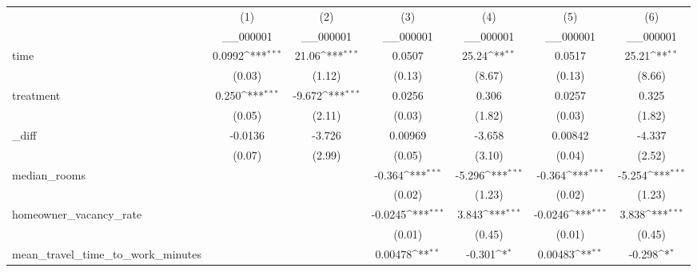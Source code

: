 {
\def\sym#1{\ifmmode^{#1}\else\(^{#1}\)\fi}
\begin{tabular}{l*{6}{c}}
\hline\hline
            &\multicolumn{1}{c}{(1)}&\multicolumn{1}{c}{(2)}&\multicolumn{1}{c}{(3)}&\multicolumn{1}{c}{(4)}&\multicolumn{1}{c}{(5)}&\multicolumn{1}{c}{(6)}\\
            &\multicolumn{1}{c}{\_\_000001}&\multicolumn{1}{c}{\_\_000001}&\multicolumn{1}{c}{\_\_000001}&\multicolumn{1}{c}{\_\_000001}&\multicolumn{1}{c}{\_\_000001}&\multicolumn{1}{c}{\_\_000001}\\
\hline
time        &      0.0992\sym{***}&       21.06\sym{***}&      0.0507         &       25.24\sym{**} &      0.0517         &       25.21\sym{**} \\
            &      (0.03)         &      (1.12)         &      (0.13)         &      (8.67)         &      (0.13)         &      (8.66)         \\
[1em]
treatment   &       0.250\sym{***}&      -9.672\sym{***}&      0.0256         &       0.306         &      0.0257         &       0.325         \\
            &      (0.05)         &      (2.11)         &      (0.03)         &      (1.82)         &      (0.03)         &      (1.82)         \\
[1em]
\_diff       &     -0.0136         &      -3.726         &     0.00969         &      -3.658         &     0.00842         &      -4.337         \\
            &      (0.07)         &      (2.99)         &      (0.05)         &      (3.10)         &      (0.04)         &      (2.52)         \\
[1em]
median\_rooms&                     &                     &      -0.364\sym{***}&      -5.296\sym{***}&      -0.364\sym{***}&      -5.254\sym{***}\\
            &                     &                     &      (0.02)         &      (1.23)         &      (0.02)         &      (1.23)         \\
[1em]
homeowner\_vacancy\_rate&                     &                     &     -0.0245\sym{***}&       3.843\sym{***}&     -0.0246\sym{***}&       3.838\sym{***}\\
            &                     &                     &      (0.01)         &      (0.45)         &      (0.01)         &      (0.45)         \\
[1em]
mean\_travel\_time\_to\_work\_minutes&                     &                     &     0.00478\sym{**} &      -0.301\sym{*}  &     0.00483\sym{**} &      -0.298\sym{*}  \\

\end{tabular}}

